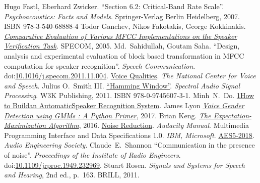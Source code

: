 \documentclass[a4paper,12pt]{article}
\begin{document}
\begin{thebibliography}{99}
   Hugo Fastl, Eberhard Zwicker.
    ``Section 6.2: Critical-Band Rate Scale''.
    \emph{Psychoacoustics: Facts and Models}.
    Springer-Verlag Berlin Heidelberg, 2007.  ISBN 978-3-540-68888-4
   Todor Ganchev, Nikos Fakotakis, George Kokkinakis.
    \emph{\href{https://web.archive.org/web/20110717210107/http://www.wcl.ece.upatras.gr/ganchev/Papers/ganchev17.pdf}{Comparative Evaluation of Various MFCC Implementations on the Speaker Verification Task}}.
    SPECOM, 2005.
   Md.~Sahidullah, Goutam Saha.
    ``Design, analysis and experimental evaluation of block based transformation in MFCC computation for speaker recognition''.
    \emph{Speech Communication}.
    doi:\href{https://doi.org/10.1016/j.specom.2011.11.004}{10.1016/j.specom.2011.11.004}.
   \href{http://www.ncvs.org/ncvs/tutorials/voiceprod/tutorial/quality.html}{Voice Qualities}.
    \emph{The National Center for Voice and Speech}.
   Julius O.~Smith III.
    \href{https://ccrma.stanford.edu/~jos/sasp/Hamming_Window.html}{``Hamming Window''}.
    \emph{Spectral Audio Signal Processing}.
    W3K Publishing, 2011.  ISBN 978-0-9745607-3-1.
   Minh~N.~Do.
    \href{https://pdfs.semanticscholar.org/438f/e1229531ae20867ae58756b09d93c979077d.pdf}{1How to Buildan AutomaticSpeaker Recognition System}.
   James Lyon
    \emph{\href{https://appliedmachinelearning.blog/2017/06/14/voice-gender-detection-using-gmms-a-python-primer/}{Voice Gender Detection using GMMs : A Python Primer}}, 2017.
   Brian Keng.
    \emph{\href{http://bjlkeng.github.io/posts/the-expectation-maximization-algorithm/}{The Expectation-Maximization Algorithm}}, 2016.
   \href{https://manual.audacityteam.org/man/noise_reduction.html}{Noise Reduction}.
    \emph{Audacity Manual}.
   Multimedia Programming Interface and Data Specifications 1.0.
    \emph{IBM, Microsoft}.
   \href{http://www.aes.org/publications/standards/search.cfm?docID=14}{AES5-2018}.
    \emph{Audio Engineering Society}.
    Claude~E.~Shannon
    ``Communication in the presence of noise''.
    \emph{Proceedings of the Institute of Radio Engineers}.
    doi:\href{https://doi.org/10.1109%2Fjrproc.1949.232969}{10.1109/jrproc.1949.232969}.
   Stuart Rosen.
    \emph{Signals and Systems for Speech and Hearing}, 2nd ed., p.~163.
    BRILL, 2011.
\end{thebibliography}
\end{document}
